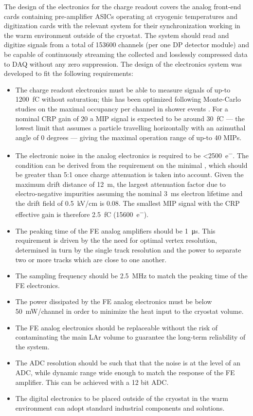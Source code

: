 The design of the electronics for the charge readout covers the analog front-end cards containing pre-amplifier ASICs operating at cryogenic temperatures and digitization cards with the relevant system for their synchronization working in the warm environment outside of the cryostat. The system should read and digitize signals from a total of \num{153600} channels (per one DP detector module) and be capable of continuously streaming the collected and losslessly compressed data to DAQ without any zero suppression. 
The design of the  electronics system was developed to fit the following requirements:
\begin{itemize}
\item{The charge readout electronics must be able to measure signals of up-to \SI{1200}{\femto\coulomb} without saturation; this has been optimized following Monte-Carlo studies on the maximal occupancy per channel in shower events \cite{WA105_TDR}. For a nominal CRP gain of \num{20} a MIP signal is expected to be around \SI{30}{fC} --- the lowest limit that assumes a particle travelling horizontally with an azimuthal angle of \num{0} degrees --- giving the maximal operation range of up-to \num{40} MIPs.}
\item{The electronic noise in the  analog electronics is required to be \SI{<2500}{e^{-}}. The condition can be derived from the requirement on the minimal , which should be greater than \num{5}:\num{1} once charge attenuation is taken into account. Given the maximum drift distance of \SI{12}{\meter}, the largest attenuation factor due to electro-negative impurities assuming the nominal \SI{3}{\milli\second} electron lifetime and the drift field of \SI{0.5}{\kilo\volt/\cm} is \num{0.08}. The smallest MIP signal with the CRP effective gain is therefore \SI{2.5}{\femto\coulomb} (\SI{15600}{e^{-}}).}
\item{The peaking time of the FE analog amplifiers should be \SI{1}{\micro\second}. This requirement is driven by the the need for optimal vertex resolution, determined in turn by the single track resolution and the power to separate two or more tracks which are close to one another.}
\item{The sampling frequency should be \SI{2.5}{\MHz} to match the peaking time of the FE electronics.}

\item{The power dissipated by the FE analog electronics must be below \SI{50}{\milli\watt/channel} in order to minimize the heat input to the cryostat volume.}
\item{The FE analog electronics should be replaceable without the risk of contaminating the main LAr volume to guarantee the long-term reliability of the system.}
\item{The ADC resolution should be such that that the noise is at the level of an ADC, while dynamic range wide enough to match the response of the FE amplifier. This can be achieved with a 12 bit ADC.}
\item{The digital electronics to be placed outside of the cryostat in the warm environment can adopt standard industrial components and solutions.}
\end{itemize}
